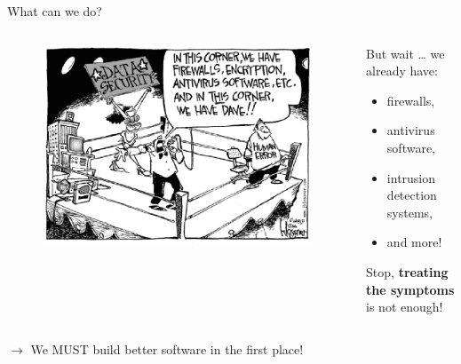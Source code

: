 \documentclass[aspectratio=169]{beamer}
\begin{document}
  \begin{frame}{What can we do?}
    \vspace{-1.4em}
    \begin{columns}[b]
      \begin{column}{0.5\textwidth}
        \begin{figure}
          \centering
          \includegraphics[scale=0.38]{figures/dave}
        \end{figure}
      \end{column}
      \begin{column}{0.5\textwidth}
        But wait \ldots{} we already have:
        \begin{itemize}
        \item firewalls,
        \item antivirus software,
        \item intrusion detection systems,
        \item and more!
        \end{itemize}
        \pause
        Stop, \textbf{treating the symptoms} is not enough!
      \end{column}
    \end{columns}
    \centering
    \vfill
    \pause
    {\LARGE $\to$ We MUST build \alert{better software} in the first place!}
  \end{frame}
\end{document}
